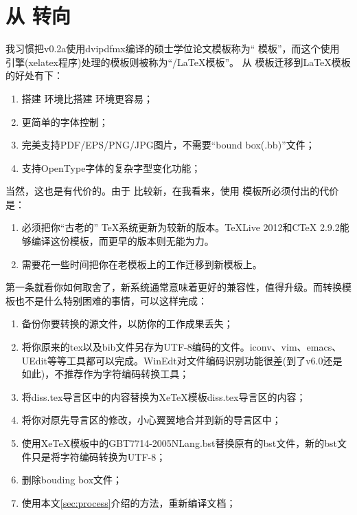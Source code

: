 \chapter{从 \CJKLaTeX 转向 \XeTeX }
\label{chap:whydvipdfm}

我习惯把v0.2a使用dvipdfmx编译的硕士学位论文模板称为“ \CJKLaTeX 模板”，而这个使用 \XeTeX 引擎(xelatex程序)处理的模板则被称为“{\XeTeX/\LaTeX}模板”。
从 \CJKLaTeX 模板迁移到{\XeTeX\LaTeX}模板的好处有下：
\begin{enumerate}
\item[\large\smiley] 搭建 \XeTeX 环境比搭建 \CJKLaTeX 环境更容易；
\item[\large\smiley] 更简单的字体控制；
\item[\large\smiley] 完美支持PDF/EPS/PNG/JPG图片，不需要“bound box(.bb)”文件；
\item[\large\smiley] 支持OpenType字体的复杂字型变化功能；
\end{enumerate}

当然，这也是有代价的。由于 \XeTeX 比较新，在我看来，使用 \XeTeX 模板所必须付出的代价是：

\begin{enumerate}
\item[\large\frownie] 必须把你“古老的” \TeX 系统更新为较新的版本。TeXLive 2012和CTeX 2.9.2能够编译这份模板，而更早的版本则无能为力。
\item[\large\frownie] 需要花一些时间把你在老模板上的工作迁移到新模板上。
\end{enumerate}

第一条就看你如何取舍了，新系统通常意味着更好的兼容性，值得升级。而转换模板也不是什么特别困难的事情，可以这样完成：

\begin{enumerate}
\item 备份你要转换的源文件，以防你的工作成果丢失；
\item 将你原来的tex以及bib文件另存为UTF-8编码的文件。iconv、vim、emacs、UEdit等等工具都可以完成。WinEdt对文件编码识别功能很差(到了v6.0还是如此)，不推荐作为字符编码转换工具；
\item 将diss.tex导言区中的内容替换为XeTeX模板diss.tex导言区的内容；
\item 将你对原先导言区的修改，小心翼翼地合并到新的导言区中；
\item 使用XeTeX模板中的GBT7714-2005NLang.bst替换原有的bst文件，新的bst文件只是将字符编码转换为UTF-8；
\item 删除bouding box文件；
\item 使用本文\ref{sec:process}介绍的方法，重新编译文档；
\end{enumerate}

